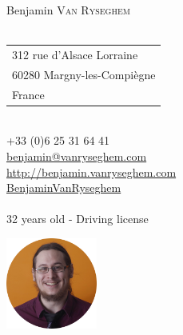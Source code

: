 \documentclass{curve}
\title{}
\begin{document}

\begin{minipage}{7cm}
\large
Benjamin \textsc{Van Ryseghem}\\
\normalsize
\\
{ \begin{tabular}{@{}l}
312 rue d'Alsace Lorraine\\
60280 Margny-les-Compiègne\\
France
\end{tabular}}\\

{ +33 (0)6 25 31 64 41}\\
\href{mailto:benjamin@vanryseghem.com}{ benjamin@vanryseghem.com}\\
\href{http://benjamin.vanryseghem.com}{ \url{http://benjamin.vanryseghem.com}}\\
\href{https://github.com/BenjaminVanRyseghem}{ BenjaminVanRyseghem}\\
\\32 years old - Driving license
\end{minipage}
\hfill
\begin{minipage}{7cm}
  \begin{flushright}
  \includegraphics[height=3cm]{Moi}
  \end{flushright}
\end{minipage}
\maketitle
\vspace{-1cm}
\end{document}
